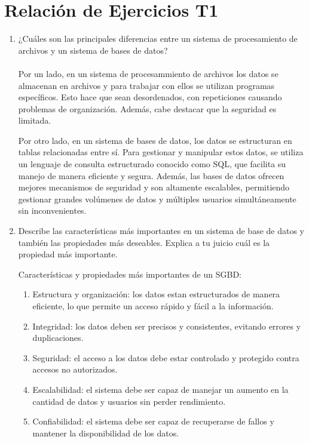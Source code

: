 \section{Relación de Ejercicios T1}

\begin{enumerate}
    \item ¿Cuáles son las principales diferencias entre un sistema de procesamiento de archivos y un sistema de bases de datos?
    \\\\
    Por un lado, en un sistema de procesammiento de archivos los datos se almacenan en archivos y para trabajar con ellos se utilizan programas específicos. Esto hace que sean desordenados, con repeticiones causando problemas de organización. Además, cabe destacar que la seguridad es limitada. 

    Por otro lado, en un sistema de bases de datos, los datos se estructuran en tablas relacionadas entre sí. Para gestionar y manipular estos datos, se utiliza un lenguaje de consulta estructurado conocido como SQL, que facilita su manejo de manera eficiente y segura. Además, las bases de datos ofrecen mejores mecanismos de seguridad y son altamente escalables, permitiendo gestionar grandes volúmenes de datos y múltiples usuarios simultáneamente sin inconvenientes.


    \item Describe las características más importantes en un sistema de base de datos y también las propiedades más deseables. Explica a tu juicio cuál es la propiedad más importante.
    
    Características y propiedades más importantes de un SGBD:

    \begin{enumerate}[label=\alph*)]
        \item Estructura y organización: los datos estan estructurados de manera eficiente, lo que permite un acceso rápido y fácil a la información.
        \item Integridad: los datos deben ser precisos y consistentes, evitando errores y duplicaciones.
        \item Seguridad: el acceso a los datos debe estar controlado y protegido contra accesos no autorizados.
        \item Escalabilidad: el sistema debe ser capaz de manejar un aumento en la cantidad de datos y usuarios sin perder rendimiento.
        \item Confiabilidad: el sistema debe ser capaz de recuperarse de fallos y mantener la disponibilidad de los datos.
    \end{enumerate}


\end{enumerate}
